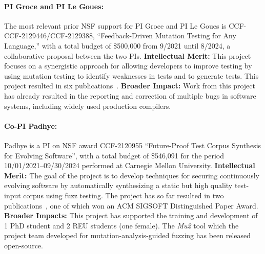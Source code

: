 \paragraph{PI Groce and PI Le Goues:}
The most relevant prior NSF support for PI Groce and PI Le Goues is CCF-
CCF-2129446/CCF-2129388, ``Feedback-Driven Mutation Testing for Any Language,'' with a 
total budget of \$500,000 from 9/2021 until 8/2024,
a collaborative proposal between the two PIs. {\bf Intellectual Merit:} This project
focuses on a synergistic approach for allowing developers
to improve testing by using mutation testing to identify
weaknesses in tests and to generate tests.  This project resulted in six
publications~\cite{cc2022,seip2022,fuzzing22,fse23,issre23, FSE24UM}. {\bf
  Broader
  Impact:}  Work from this project has already
resulted in the reporting and correction of multiple bugs in software
systems, including widely used production compilers.


\paragraph{Co-PI Padhye:}

Padhye is a PI on NSF award CCF-2120955 ``Future-Proof Test Corpus Synthesis for Evolving Software'',
with a total budget of 	\$546,091 for the period 10/01/2021--09/30/2024 performed 
at Carnegie Mellon University. 
{\bf Intellectual Merit:} The goal of the project is to develop techniques for securing continuously evolving software 
by automatically synthesizing a static but high quality test-input corpus using 
fuzz testing. The project has so far resulted in two publications~\cite{naturalfuzz, mu2}, one
of which won an ACM SIGSOFT Distinguished Paper Award. {\bf Broader Impacts:} 
This project has supported the training and development of 1 PhD student and 
2 REU students (one female). The \emph{Mu2} tool which the project team developed
for mutation-analysis-guided fuzzing has been released open-source. 

